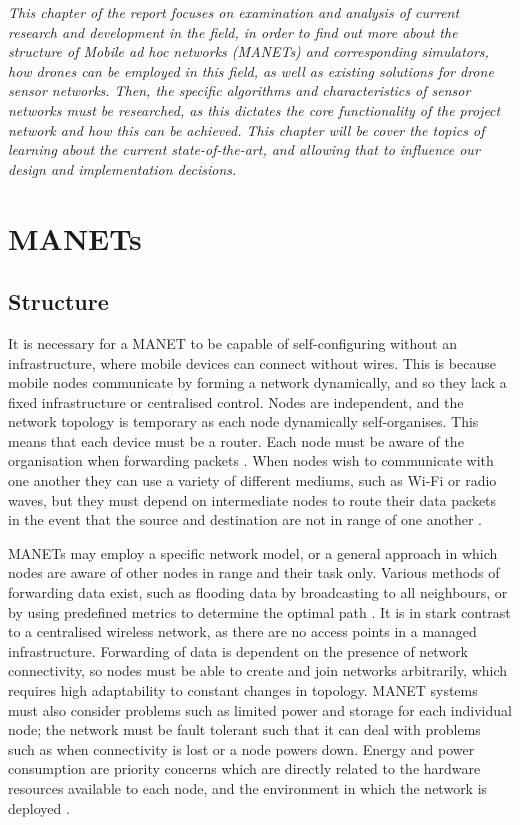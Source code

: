 \label{litreview}
\emph{This chapter of the report focuses on examination and analysis of current research and development in the field, in order to find out more about the structure of Mobile ad hoc networks (MANETs) and corresponding simulators, how drones can be employed in this field, as well as existing solutions for drone sensor networks. Then, the specific algorithms and characteristics of sensor networks must be researched, as this dictates the core functionality of the project network and how this can be achieved. This chapter will be cover the topics of learning about the current state-of-the-art, and allowing that to influence our design and implementation decisions.}

\section{MANETs}

\subsection{Structure}
It is necessary for a MANET to be capable of self-configuring without an infrastructure, where mobile devices can connect without wires. This is because mobile nodes communicate by forming a network dynamically, and so they lack a fixed infrastructure or centralised control. Nodes are independent, and the network topology is temporary as each node dynamically self-organises. This means that each device must be a router. Each node must be aware of the organisation when forwarding packets \cite{jaydipsen2010}. When nodes wish to communicate with one another they can use a variety of different mediums, such as Wi-Fi or radio waves, but they must depend on intermediate nodes to route their data packets in the event that the source and destination are not in range of one another \cite{ramramathanjasonredi2012}.

MANETs may employ a specific network model, or a general approach in which nodes are aware of other nodes in range and their task only. Various methods of forwarding data exist, such as flooding data by broadcasting to all neighbours, or by using predefined metrics to determine the optimal path \cite{jaydipsen2010}. It is in stark contrast to a centralised wireless network, as there are no access points in a managed infrastructure. Forwarding of data is dependent on the presence of network connectivity, so nodes must be able to create and join networks arbitrarily, which requires high adaptability to constant changes in topology. MANET systems must also consider problems such as limited power and storage for each individual node; the network must be fault tolerant such that it can deal with problems such as when connectivity is lost or a node powers down. Energy and power consumption are priority concerns which are directly related to the hardware resources available to each node, and the environment in which the network is deployed \cite{sajshahmina2012}.

